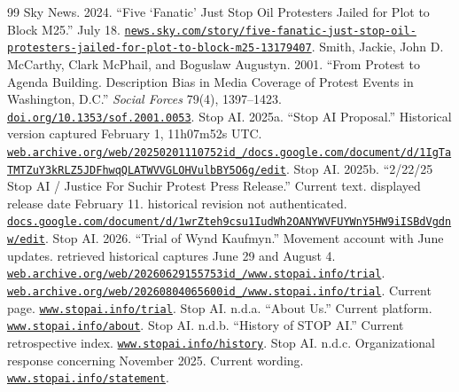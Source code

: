 \documentclass[11pt]{article}
\begin{document}
\begin{thebibliography}{99}
 Sky News. 2024. ``Five `Fanatic' Just Stop Oil Protesters Jailed for Plot to Block M25.'' July 18. \href{https://news.sky.com/story/five-fanatic-just-stop-oil-protesters-jailed-for-plot-to-block-m25-13179407}{\nolinkurl{news.sky.com/story/five-fanatic-just-stop-oil-protesters-jailed-for-plot-to-block-m25-13179407}}.
 Smith, Jackie, John D. McCarthy, Clark McPhail, and Boguslaw Augustyn. 2001. ``From Protest to Agenda Building.  Description Bias in Media Coverage of Protest Events in Washington, D.C.'' \emph{Social Forces} 79(4), 1397--1423. \href{https://doi.org/10.1353/sof.2001.0053}{\nolinkurl{doi.org/10.1353/sof.2001.0053}}.
 Stop AI. 2025a. ``Stop AI Proposal.'' Historical version captured February 1, 11h07m52s UTC. \href{https://web.archive.org/web/20250201110752id_/https://docs.google.com/document/d/1IgTaTMTZuY3kRLZ5JDFhwqQLATWVVGLOHVulbBY5O6g/edit}{\nolinkurl{web.archive.org/web/20250201110752id_/docs.google.com/document/d/1IgTaTMTZuY3kRLZ5JDFhwqQLATWVVGLOHVulbBY5O6g/edit}}.
 Stop AI. 2025b. ``2/22/25 Stop AI / Justice For Suchir Protest Press Release.'' Current text. displayed release date February 11. historical revision not authenticated. \href{https://docs.google.com/document/d/1wrZteh9csu1IudWh2OANYWVFUYWnY5HW9iISBdVgdnw/edit}{\nolinkurl{docs.google.com/document/d/1wrZteh9csu1IudWh2OANYWVFUYWnY5HW9iISBdVgdnw/edit}}.
 Stop AI. 2026. ``Trial of Wynd Kaufmyn.'' Movement account with June updates. retrieved historical captures June 29 and August 4. \href{https://web.archive.org/web/20260629155753id_/https://www.stopai.info/trial}{\nolinkurl{web.archive.org/web/20260629155753id_/www.stopai.info/trial}}. \href{https://web.archive.org/web/20260804065600id_/https://www.stopai.info/trial}{\nolinkurl{web.archive.org/web/20260804065600id_/www.stopai.info/trial}}. Current page.  \href{https://www.stopai.info/trial}{\nolinkurl{www.stopai.info/trial}}.
 Stop AI. n.d.a. ``About Us.'' Current platform. \href{https://www.stopai.info/about}{\nolinkurl{www.stopai.info/about}}.
 Stop AI. n.d.b. ``History of STOP AI.'' Current retrospective index. \href{https://www.stopai.info/history}{\nolinkurl{www.stopai.info/history}}.
 Stop AI. n.d.c. Organizational response concerning November 2025. Current wording. \href{https://www.stopai.info/statement}{\nolinkurl{www.stopai.info/statement}}.

\end{thebibliography}
\end{document}
